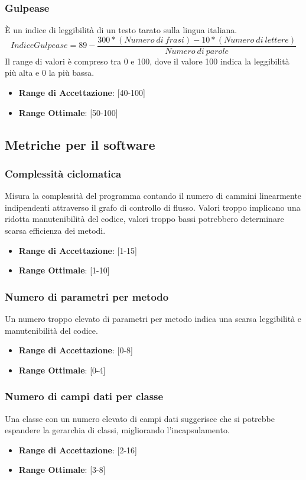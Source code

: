 \documentclass[12pt,a4paper]{article}
\begin{document}
\subsubsection{Gulpease}
È un indice di leggibilità di un testo tarato sulla lingua italiana.
\[IndiceGulpease=89-\frac{300*(Numero\ di\ frasi)-10*(Numero\ di\ lettere)}{Numero\ di\ parole}\]
Il range di valori è compreso tra 0 e 100, dove il valore 100 indica la leggibilità più alta e 0 la più bassa.
\begin{itemize}
\item \textbf{Range di Accettazione}: [40-100]
\item \textbf{Range Ottimale}: [50-100]
\end{itemize}
\subsection{ Metriche per il software}\label{metriche_sw}
\subsubsection{Complessità ciclomatica}
Misura la complessità del programma contando il numero di cammini linearmente indipendenti attraverso il grafo di controllo di flusso. Valori troppo implicano una ridotta manutenibilità del codice, valori troppo bassi potrebbero determinare scarsa efficienza dei metodi.
\begin{itemize}
\item \textbf{Range di Accettazione}: [1-15]
\item \textbf{Range Ottimale}: [1-10]
\end{itemize}
\subsubsection{Numero di parametri per metodo}
Un numero troppo elevato di parametri per metodo indica una scarsa leggibilità e manutenibilità del codice.
\begin{itemize}
\item \textbf{Range di Accettazione}: [0-8]
\item \textbf{Range Ottimale}: [0-4]
\end{itemize}
\subsubsection{Numero di campi dati per classe}
Una classe con un numero elevato di campi dati suggerisce che si potrebbe espandere la gerarchia di classi, migliorando l'incapsulamento.
\begin{itemize}
\item \textbf{Range di Accettazione}: [2-16]
\item \textbf{Range Ottimale}: [3-8]
\end{itemize}
\end{document}
